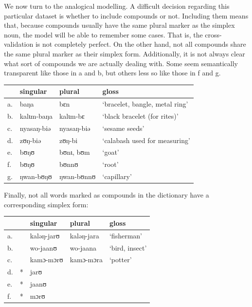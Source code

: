We now turn to the analogical modelling. A difficult decision regarding this particular dataset is whether to include compounds or not. Including them means that, because compounds usually have the same plural marker as the simplex noun, the model will be able to remember some cases. That is, the cross-validation is not completely perfect. On the other hand, not all compounds share the same plural marker as their simplex form. Additionally, it is not always clear what sort of compounds we are actually dealing with. Some seem semantically transparent like those in a and b, but others less so like those in f and g.

\begin{exe}
    \ex \label{different-pl-kasem}
    \begin{tabular}[t]{llll}
      & singular                         & plural     & gloss                          \\
      \midrule
      a. & baŋa       & bɛn        & `bracelet, bangle, metal ring' \\
      b. & kalɩm-baŋa & kalɩm-bɛ   & `black bracelet (for rites)'   \\
      c. & nyasaŋ-biə                       & nyasaŋ-biə & `sesame seeds'    \\
      d. & zʊŋ-biə                          & zʊŋ-bi     & `calabash used for measuring'\\
      e. & bʊŋʊ                             & bʊnɩ, bʊm  & `goat'  \\
      f. & bʊŋʊ       & bʊnnʊ      & `root'                         \\
      g. & ŋwan-bʊŋʊ  & ŋwan-bʊnnʊ & `capillary'                    \\
    \end{tabular}
\end{exe}

Finally, not all words marked as compounds in the dictionary have a corresponding simplex form:

\begin{exe}
    \ex \label{no-simplex-kasem}
    \begin{tabular}[t]{ll@{}lll}
         &   & singular   & plural     & gloss          \\
      \midrule
      a. &   & kaləŋ-jarʊ & kaləŋ-jara & `fisherman'    \\
      b. &   & wo-jaanʊ   & wo-jaana   & `bird, insect' \\
      c. &   & kamɔ-mɔrʊ  & kamɔ-mɔra  & `potter'       \\
      d. & * & jarʊ                                    \\
      e. & * & jaanʊ                                   \\
      f. & * & mɔrʊ                                    \\
    \end{tabular}
\end{exe}

